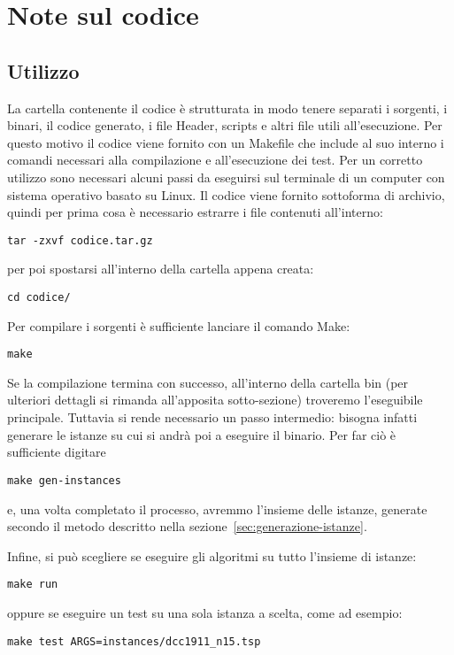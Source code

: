 
\section{Note sul codice}\label{sec:codice}
\subsection{Utilizzo}\label{subsec:utilizzo}
La cartella contenente il codice è strutturata in modo tenere separati i sorgenti, i binari, il codice generato,
i file Header, scripts e altri file utili all'esecuzione.
Per questo motivo il codice viene fornito con un \textsf{Makefile} che include al suo interno i comandi
necessari alla compilazione e all'esecuzione dei test.
Per un corretto utilizzo sono necessari alcuni passi da eseguirsi sul terminale di un computer con sistema
operativo basato su Linux.
%
Il codice viene fornito sottoforma di archivio, quindi per prima cosa è necessario estrarre
i file contenuti all'interno:
\label{lst:make-passo-1}
\begin{lstlisting}[style=BashStyle]
tar -zxvf codice.tar.gz
\end{lstlisting}
per poi spostarsi all'interno della cartella appena creata:
\label{lst:make-passo-2}
\begin{lstlisting}[style=BashStyle]
cd codice/
\end{lstlisting}
%
Per compilare i sorgenti è sufficiente lanciare il comando \textsf{Make}:
\label{lst:make-passo-3}
\begin{lstlisting}[style=BashStyle]
make
\end{lstlisting}
%
Se la compilazione termina con successo, all'interno della
cartella \textsf{bin} (per ulteriori dettagli si rimanda all'apposita sotto-sezione) troveremo
l'eseguibile principale.
Tuttavia si rende necessario un passo intermedio: bisogna infatti generare le istanze su cui si andrà
poi a eseguire il binario.
Per far ciò è sufficiente digitare
\label{lst:make-passo-4}
\begin{lstlisting}[style=BashStyle]
make gen-instances
\end{lstlisting}
e, una volta completato il processo, avremmo l'insieme delle istanze, generate secondo il metodo
descritto nella sezione~\ref{sec:generazione-istanze}.

Infine, si può scegliere se eseguire gli algoritmi su tutto l'insieme di istanze:
\label{lst:make-passo-5}
\begin{lstlisting}[style=BashStyle]
make run
\end{lstlisting}
oppure se eseguire un test su una sola istanza a scelta, come ad esempio:
\label{lst:make-passo-6}
\begin{lstlisting}[style=BashStyle]
make test ARGS=instances/dcc1911_n15.tsp
\end{lstlisting}
